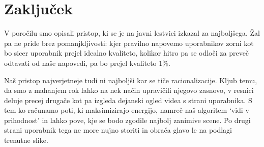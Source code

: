 \section{Zaključek} 

V poročilu smo opisali pristop, ki se je na javni lestvici izkazal za
najboljšega. Žal pa ne pride brez pomanjkljivosti: kjer pravilno napovemo
uporabnikov zorni kot bo sicer uporabnik prejel idealno kvaliteto, kolikor
hitro pa se odloči za preveč odtavati od naše napovedi, pa bo prejel kvaliteto
$1\%$.

Naš pristop najverjetneje tudi ni najboljši kar se tiče racionalizacije. Kljub
temu, da smo z mahanjem rok lahko na nek način upravičili njegovo zasnovo,
v resnici deluje precej drugače kot pa izgleda dejanski ogled videa s strani
uporabnika. S tem ko računamo poti, ki maksimizirajo energijo, namreč naš
algoritem `vidi v prihodnost' in lahko pove, kje se bodo zgodile najbolj
zanimive scene. Po drugi strani uporabnik tega ne more nujno storiti in obrača
glavo le na podlagi trenutne slike.
